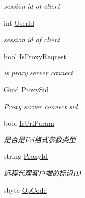 \begin{DoxyCompactItemize}
\begin{DoxyCompactList}\small\item\em session id of client \end{DoxyCompactList}\item 
int \mbox{\hyperlink{class_t_net_1_1_contract_1_1_request_package_ae0a08a2f200563dc29f7e1625486a0a1}{User\+Id}}
\begin{DoxyCompactList}\small\item\em session id of client \end{DoxyCompactList}\item 
bool \mbox{\hyperlink{class_t_net_1_1_contract_1_1_request_package_a1e6c47e96b7fe77d2989fadd1e7ab2ed}{Is\+Proxy\+Request}}
\begin{DoxyCompactList}\small\item\em is proxy server connect \end{DoxyCompactList}\item 
Guid \mbox{\hyperlink{class_t_net_1_1_contract_1_1_request_package_a0a722013bfaab9253906d50d093fd879}{Proxy\+Sid}}
\begin{DoxyCompactList}\small\item\em Proxy server connect sid \end{DoxyCompactList}\item 
bool \mbox{\hyperlink{class_t_net_1_1_contract_1_1_request_package_ac05be0619f24196b4e841ae041bc9f96}{Is\+Url\+Param}}
\begin{DoxyCompactList}\small\item\em 是否是\+Url格式参数类型 \end{DoxyCompactList}\item 
string \mbox{\hyperlink{class_t_net_1_1_contract_1_1_request_package_a6980fa4d3ff7031ae54f8bb2ef74293e}{Proxy\+Id}}
\begin{DoxyCompactList}\small\item\em 远程代理客户端的标识\+ID \end{DoxyCompactList}\item 
sbyte \mbox{\hyperlink{class_t_net_1_1_contract_1_1_request_package_a87e992561b6e2f4d508b86c4937aa93e}{Op\+Code}}

\end{DoxyCompactItemize}
